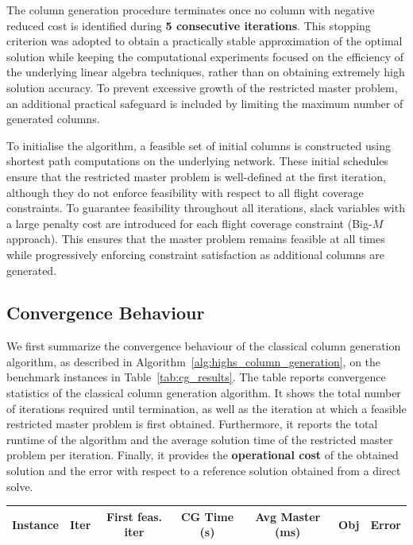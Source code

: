 \documentclass{book}
\theoremstyle{definition}
\newcounter{algorithm_}
\numberwithin{algorithm_}{chapter}
\begin{document}
{\bigskip

The column generation procedure terminates once no column with negative reduced cost is identified during \textbf{5 consecutive iterations}. This stopping criterion was adopted to obtain a practically stable approximation of the optimal solution while keeping the computational experiments focused on the efficiency of the underlying linear algebra techniques, rather than on obtaining extremely high solution accuracy. To prevent excessive growth of the restricted master problem, an additional practical safeguard is included by limiting the maximum number of generated columns.

\bigskip

To initialise the algorithm, a feasible set of initial columns is constructed using shortest path computations on the underlying network. These initial schedules ensure that the restricted master problem is well-defined at the first iteration, although they do not enforce feasibility with respect to all flight coverage constraints.
To guarantee feasibility throughout all iterations, slack variables with a large penalty cost are introduced for each flight coverage constraint (Big-$M$ approach). This ensures that the master problem remains feasible at all times while progressively enforcing constraint satisfaction as additional columns are generated.


\subsection{Convergence Behaviour}

We first summarize the convergence behaviour of the classical column generation algorithm, as described in Algorithm~\ref{alg:highs_column_generation}, on the benchmark instances in Table~\ref{tab:cg_results}.
The table reports convergence statistics of the classical column generation algorithm. It shows the total number of iterations required until termination, as well as the iteration at which a feasible restricted master problem is first obtained. Furthermore, it reports the total runtime of the algorithm and the average solution time of the restricted master problem per iteration. Finally, it provides the \textbf{operational cost} of the obtained solution and the error with respect to a reference solution obtained from a direct solve.

\begin{table}[ht]
\centering
\renewcommand{\arraystretch}{1.2}

\begin{tabular}{c c c c c c c}
\hline
Instance & Iter & First feas. iter & CG Time (s) & Avg Master (ms) & Obj & Error \\
\hline


\end{tabular}
\end{table}}
\end{document}
